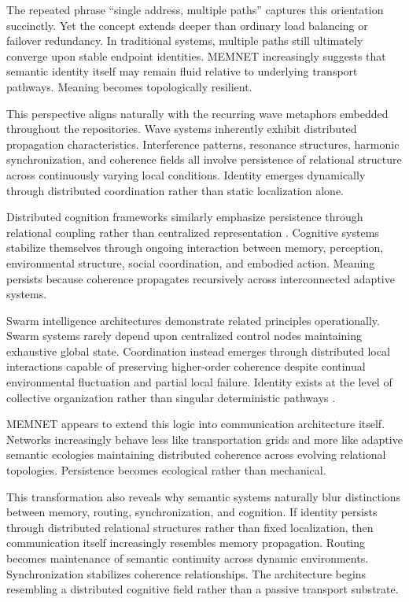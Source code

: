 \documentclass[11pt,a4paper]{article}
\begin{document}
The repeated phrase ``single address, multiple paths'' captures this orientation succinctly. Yet the concept extends deeper than ordinary load balancing or failover redundancy. In traditional systems, multiple paths still ultimately converge upon stable endpoint identities. MEMNET increasingly suggests that semantic identity itself may remain fluid relative to underlying transport pathways. Meaning becomes topologically resilient.

This perspective aligns naturally with the recurring wave metaphors embedded throughout the repositories. Wave systems inherently exhibit distributed propagation characteristics. Interference patterns, resonance structures, harmonic synchronization, and coherence fields all involve persistence of relational structure across continuously varying local conditions. Identity emerges dynamically through distributed coordination rather than static localization alone.

Distributed cognition frameworks similarly emphasize persistence through relational coupling rather than centralized representation \cite{hutchins1995}. Cognitive systems stabilize themselves through ongoing interaction between memory, perception, environmental structure, social coordination, and embodied action. Meaning persists because coherence propagates recursively across interconnected adaptive systems.

Swarm intelligence architectures demonstrate related principles operationally. Swarm systems rarely depend upon centralized control nodes maintaining exhaustive global state. Coordination instead emerges through distributed local interactions capable of preserving higher-order coherence despite continual environmental fluctuation and partial local failure. Identity exists at the level of collective organization rather than singular deterministic pathways \cite{bonabeau1999}.

MEMNET appears to extend this logic into communication architecture itself. Networks increasingly behave less like transportation grids and more like adaptive semantic ecologies maintaining distributed coherence across evolving relational topologies. Persistence becomes ecological rather than mechanical.

This transformation also reveals why semantic systems naturally blur distinctions between memory, routing, synchronization, and cognition. If identity persists through distributed relational structures rather than fixed localization, then communication itself increasingly resembles memory propagation. Routing becomes maintenance of semantic continuity across dynamic environments. Synchronization stabilizes coherence relationships. The architecture begins resembling a distributed cognitive field rather than a passive transport substrate.
\end{document}
